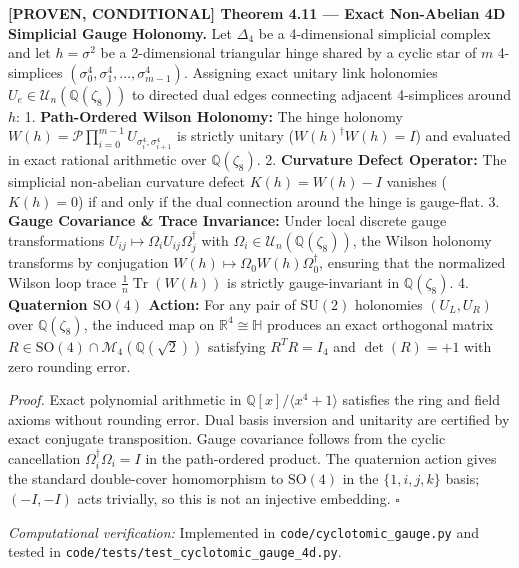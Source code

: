 \documentclass[
  english,
  10pt,
  a4paper,
]{article}
\renewenvironment{quote}
  {\begin{leftbar}\small}
  {\end{leftbar}}
\begin{document}
\begin{quote}
\textbf{{[}PROVEN, CONDITIONAL{]} Theorem 4.11 --- Exact Non-Abelian 4D
Simplicial Gauge Holonomy.} Let \(\Delta_4\) be a 4-dimensional
simplicial complex and let \(h = \sigma^2\) be a 2-dimensional
triangular hinge shared by a cyclic star of \(m\) 4-simplices
\((\sigma^4_0, \sigma^4_1, \dots, \sigma^4_{m-1})\). Assigning exact
unitary link holonomies \(U_e \in \mathcal{U}_n(\mathbb{Q}(\zeta_8))\)
to directed dual edges connecting adjacent 4-simplices around \(h\): 1.
\textbf{Path-Ordered Wilson Holonomy:} The hinge holonomy
\(W(h) = \mathcal{P} \prod_{i=0}^{m-1} U_{\sigma^4_i, \sigma^4_{i+1}}\)
is strictly unitary (\(W(h)^\dagger W(h) = I\)) and evaluated in exact
rational arithmetic over \(\mathbb{Q}(\zeta_8)\). 2. \textbf{Curvature
Defect Operator:} The simplicial non-abelian curvature defect
\(K(h) = W(h) - I\) vanishes (\(K(h) = 0\)) if and only if the dual
connection around the hinge is gauge-flat. 3. \textbf{Gauge Covariance
\& Trace Invariance:} Under local discrete gauge transformations
\(U_{ij} \mapsto \Omega_i U_{ij} \Omega_j^\dagger\) with
\(\Omega_i \in \mathcal{U}_n(\mathbb{Q}(\zeta_8))\), the Wilson holonomy
transforms by conjugation
\(W(h) \mapsto \Omega_0 W(h) \Omega_0^\dagger\), ensuring that the
normalized Wilson loop trace \(\frac{1}{n}\operatorname{Tr}(W(h))\) is
strictly gauge-invariant in \(\mathbb{Q}(\zeta_8)\). 4.
\textbf{Quaternion \(\mathrm{SO}(4)\) Action:} For any pair of
\(\mathrm{SU}(2)\) holonomies \((U_L, U_R)\) over
\(\mathbb{Q}(\zeta_8)\), the induced map on
\(\mathbb{R}^4 \cong \mathbb{H}\) produces an exact orthogonal matrix
\(R \in \mathrm{SO}(4) \cap \mathcal{M}_4(\mathbb{Q}(\sqrt{2}))\)
satisfying \(R^T R = I_4\) and \(\det(R) = +1\) with zero rounding
error.

\emph{Proof.} Exact polynomial arithmetic in
\(\mathbb{Q}[x]/\langle x^4+1 \rangle\) satisfies the ring and field
axioms without rounding error. Dual basis inversion and unitarity are
certified by exact conjugate transposition. Gauge covariance follows
from the cyclic cancellation \(\Omega_i^\dagger \Omega_i = I\) in the
path-ordered product. The quaternion action gives the standard
double-cover homomorphism to \(\mathrm{SO}(4)\) in the \(\{1,i,j,k\}\)
basis; \((-I,-I)\) acts trivially, so this is not an injective
embedding. \(\square\)
\end{quote}

\emph{Computational verification:} Implemented in
\texttt{code/cyclotomic\_gauge.py} and tested in
\nolinkurl{code/tests/test_cyclotomic_gauge_4d.py}.
\end{document}
